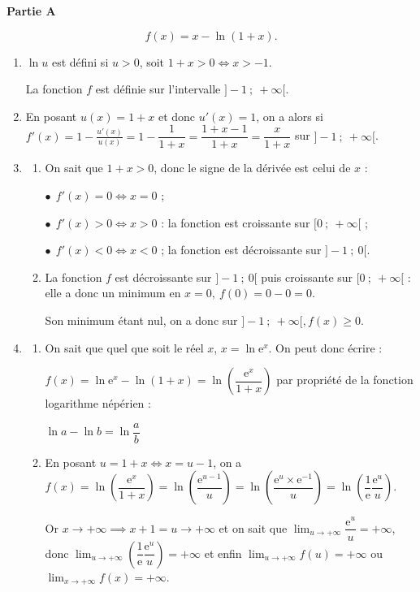 \medskip

\textbf{Partie A}

\medskip


\[f(x) = x - \ln (1 + x).\]

\begin{enumerate}
\item 
$\ln u$ est défini si $u > 0$, soit $1 + x > 0 \iff x > - 1$.

La fonction $f$ est définie sur l'intervalle $]-1~;~+ \infty[$.
\item 


En posant $u(x) = 1 + x$ et donc $u'(x) = 1$, on a alors  si $f'(x) = 1 - \frac{u'(x)}{u(x)} = 1 - \dfrac{1}{1 + x} = \dfrac{1 + x - 1}{1 + x} = \dfrac{x}{1 + x}$ sur $]-1~;~+ \infty[$.
\item 
	\begin{enumerate}
		\item 
On sait que $1 + x > 0$, donc le signe de la dérivée est celui de $x$ :
		
$\bullet~~f'(x) = 0 \iff x = 0$ ;

$\bullet~~f'(x) > 0 \iff x > 0$  : la fonction est croissante sur $[0~;~+ \infty[$ ;

$\bullet~~f'(x) < 0 \iff x < 0$ ; la fonction est décroissante sur $]-1~;~0[$.
		\item 
La fonction $f$ est décroissante sur $]-1~;~0[$ puis croissante sur $[0~;~+ \infty[$ : elle a donc un minimum en $x = 0, \: f(0 ) = 0 - 0 = 0$. 

Son minimum étant nul, on a donc sur $]-1~;~+ \infty[, f(x) \geqslant 0$.
	\end{enumerate}
\item 
	\begin{enumerate}
		\item 
On sait que quel que soit le réel $x$, $x = \ln \text{e}^x$. On peut donc écrire :


$f(x) = \ln \text{e}^x - \ln (1 + x) = \ln \left(\dfrac{\text{e}^x}{1 + x}\right)$ par propriété de la fonction logarithme népérien :

 $\ln a - \ln b = \ln \dfrac ab$


		\item 
En posant $u = 1 + x \iff x = u - 1$, on a $f(x) = \ln \left(\dfrac{\text{e}^x}{1 + x}\right) = \ln \left(\dfrac{\text{e}^{u - 1}}{u}\right) = \ln \left(\dfrac{\text{e}^{u}\times \text{e}^{-1}}{u}\right) = \ln \left(\dfrac{1}{\text{e}}\dfrac{\text{e}^{u}}{u}\right)$.
		
Or $x \to + \infty \implies x + 1 = u \to + \infty$ et on sait que $\displaystyle\lim_{u \to + \infty} \dfrac{\text{e}^u}{u} = + \infty$, donc $\displaystyle\lim_{u \to + \infty} \left(\dfrac{1}{\text{e}}\dfrac{\text{e}^{u}}{u}\right) = + \infty$ et enfin $\displaystyle\lim_{u \to + \infty} f(u) = + \infty$ ou $\displaystyle\lim_{x \to + \infty} f(x) = + \infty$.
	\end{enumerate}
\end{enumerate}

